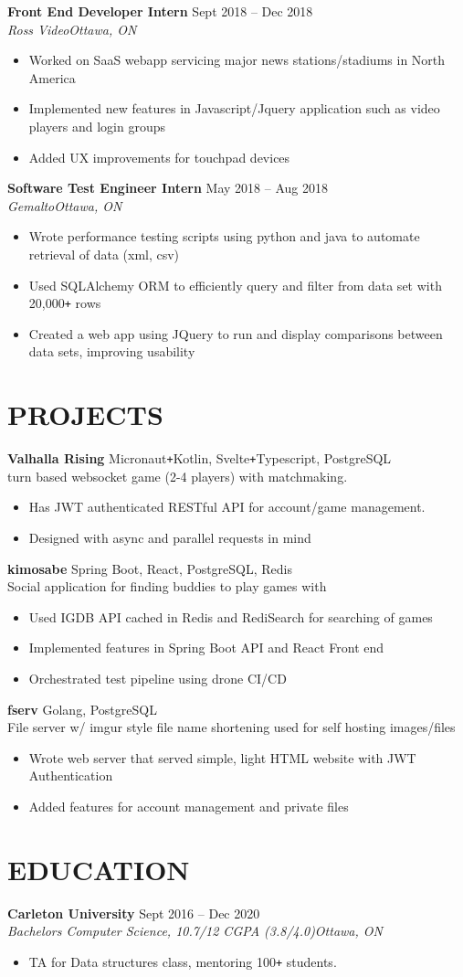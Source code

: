\documentclass[letterpaper]{article}
\newcommand{\NewPart}[1]{\section*{\uppercase{\large\textbf{#1}}}}
\newcommand{\DatedEntry}[5]{\large\textbf{#1}
	\hfill \small#2\\
	\textit{#3}\hfill\textit{#4}\\\vspace{0.10cm}
	#5\vspace{0.1cm}
}
\newcommand{\ProjectEntry}[3]{\large\textbf{#1}
	\hfill \small{#2}\\
	#3\vspace{0.1cm}
}
\begin{document}
\DatedEntry{Front End Developer Intern}
{Sept 2018 -- Dec 2018}
{Ross Video}
{Ottawa, ON}
{\begin{itemize}[nolistsep]
	\item Worked on SaaS webapp servicing major news stations/stadiums in North America
	\item Implemented new features in Javascript/Jquery application such as video players and login groups
	\item Added UX improvements for touchpad devices
\end{itemize}}
\DatedEntry{Software Test Engineer Intern}
{May 2018 -- Aug 2018}
{Gemalto}
{Ottawa, ON}
{\begin{itemize}[nolistsep]
	\item Wrote performance testing scripts using python and java to automate retrieval of data (xml, csv)
	\item Used SQLAlchemy ORM to efficiently query and filter from data set with 20,000\texttt{+} rows
	\item Created a web app using JQuery to run and display comparisons between data sets, improving usability
\end{itemize}}\vspace{-0.3cm}

\NewPart{Projects}{}
\ProjectEntry{Valhalla Rising}
{Micronaut\texttt{+}Kotlin, Svelte\texttt{+}Typescript, PostgreSQL}
{
	turn based websocket game (2-4 players) with matchmaking.\\
	\begin{itemize}
		\item Has JWT authenticated RESTful API for account/game management.
		\item Designed with async and parallel requests in mind
	\end{itemize}
}
\ProjectEntry{kimosabe}
{Spring Boot, React, PostgreSQL, Redis}
{Social application for finding buddies to play games with\\
	\begin{itemize}
		\item Used IGDB API cached in Redis and RediSearch for searching of games
		\item Implemented features in Spring Boot API and React Front end
		\item Orchestrated test pipeline using drone CI/CD
	\end{itemize}
}
\ProjectEntry{fserv}
{Golang, PostgreSQL}
{File server w/ imgur style file name shortening used for self hosting images/files\\\begin{itemize}
	\item Wrote web server that served simple, light HTML website with JWT Authentication
	\item Added features for account management and private files
\end{itemize}}\vspace{-0.3cm}

\NewPart{Education}{}
\DatedEntry{Carleton University}
{Sept 2016 -- Dec 2020}
{Bachelors Computer Science, 10.7/12 CGPA (3.8/4.0)}
{Ottawa, ON}
{\begin{itemize}
	\item TA for Data structures class, mentoring 100\texttt{+} students.
\end{itemize}}
\end{document}
